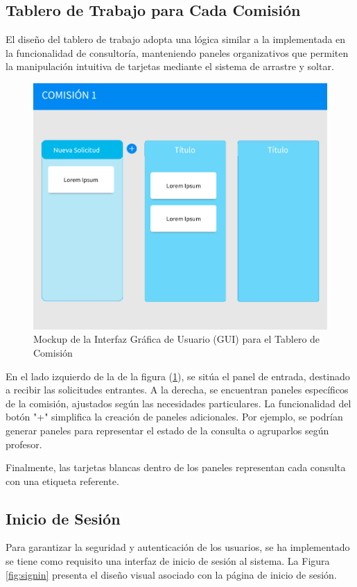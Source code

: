 \subsection{Tablero de Trabajo para Cada Comisión}

El diseño del tablero de trabajo adopta una lógica similar a la implementada en la funcionalidad de consultoría, manteniendo paneles organizativos que permiten la manipulación intuitiva de tarjetas mediante el sistema de arrastre y soltar.


\begin{figure}[H]
\centering
\includegraphics[width=1\linewidth]{fig/board.png}
\caption{Mockup de la Interfaz Gráfica de Usuario (GUI) para el Tablero de Comisión}
\label{fig:board}
\end{figure}


En el lado izquierdo de la de la figura (\ref{fig:board}), se sitúa el panel de entrada, destinado a recibir las solicitudes entrantes. A la derecha, se encuentran paneles específicos de la comisión, ajustados según las necesidades particulares. La funcionalidad del botón "+" simplifica la creación de paneles adicionales. Por ejemplo, se podrían generar paneles para representar el estado de la consulta o agruparlos según profesor.

Finalmente, las tarjetas blancas dentro de los paneles representan cada consulta con una etiqueta referente.


\subsection{Inicio de Sesión}
Para garantizar la seguridad y autenticación de los usuarios, se ha implementado se tiene como requisito una interfaz de inicio de sesión al sistema. La Figura \ref{fig:signin} presenta el diseño visual asociado con la página de inicio de sesión.

